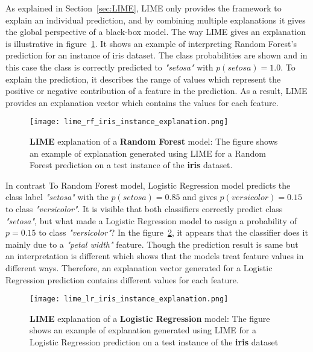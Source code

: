 \documentclass[english]{tktltiki2}
\theoremstyle{definition}
\theoremstyle{remark}
\begin{document}
As explained in Section~\ref{sec:LIME}, LIME only provides the framework to explain an individual prediction, and by combining multiple explanations it gives the global perspective of a black-box model. The way LIME gives an explanation is illustrative in figure~\ref{fig:lime_rf_iris_instance_explanation}. It shows an example of interpreting Random Forest's prediction for an instance of iris dataset. The class probabilities are shown and in this case the class is correctly predicted to \textit{"setosa"} with $p(setosa)=1.0$. To explain the prediction, it describes the range of values which represent the positive or negative contribution of a feature in the prediction. As a result, LIME provides an explanation vector which contains the values for each feature.
\begin{figure}[H]
	\centering
	\vspace*{5mm}
	\texttt{[image: lime\_rf\_iris\_instance\_explanation.png]}
	\caption{\textbf{LIME} explanation of a \textbf{Random Forest} model: The figure shows an example of explanation generated using LIME for a Random Forest prediction on a test instance of the \textbf{iris} dataset.}
	\label{fig:lime_rf_iris_instance_explanation}
\end{figure}

In contrast To Random Forest model, Logistic Regression model predicts the class label \textit{"setosa"} with the $p(setosa) = 0.85$ and gives $p(versicolor) = 0.15$ to class \textit{"versicolor"}. It is visible that both classifiers correctly predict class \textit{"setosa"}, but what made a Logistic Regression model to assign a probability of $p=0.15$ to class \textit{"versicolor"}? In the figure~\ref{fig:lime_lr_iris_instance_explanation}, it appears that the classifier does it mainly due to a \textit{"petal width"} feature. Though the prediction result is same but an interpretation is different which shows that the models treat feature values in different ways. Therefore, an explanation vector generated for a Logistic Regression prediction contains different values for each feature.
\begin{figure}[H]
	\centering
	\vspace*{5mm}
	\texttt{[image: lime\_lr\_iris\_instance\_explanation.png]}
	\caption{\textbf{LIME} explanation of a \textbf{Logistic Regression} model: The figure shows an example of explanation generated using LIME for a Logistic Regression prediction on a test instance of the \textbf{iris} dataset}
	\label{fig:lime_lr_iris_instance_explanation}
\end{figure} 
\end{document}
